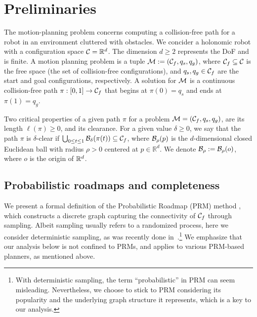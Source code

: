 \section{Preliminaries}\label{sec:preliminaries}
The motion-planning problem concerns computing a collision-free path for a robot in an environment cluttered with obstacles. We concider a holonomic robot with a configuration space $\mathcal{C} = \mathbb{R}^d$. %
The dimension $d\geq 2$ represents the DoF and is finite. A motion planning problem is a tuple $\mathcal{M}:= (\mathcal{C}_f, q_{s},  q_{g})$, where $\mathcal{C}_f\subseteq \mathcal{C}$ is the free space (the set of collision-free configurations), and $q_s,q_g\in \mathcal{C}_f$ are the start and goal configurations, respectively. A solution for $\mathcal{M}$ is a continuous collision-free path $\pi:[0,1]\to\mathcal{C}_f$ that begins at $\pi(0) = q_{s}$ and ends at $\pi(1) = q_g$.

Two critical properties of a given path $\pi$ for a problem $\mathcal{M}= (\mathcal{C}_f, q_{s},  q_{g})$, are its length $\ell(\pi)\geq 0$, and its clearance. For a given value $\delta\geq 0$, we say that the path $\pi$ is $\delta$-clear if $\bigcup_{0 \leq t \leq 1}\mathcal{B}_{\delta}(\pi(t)) \subseteq \mathcal{C}_f$, where $\mathcal{B}_\rho(p)$ is the $d$-dimensional closed Euclidean ball with radius $\rho>0$ centered at $p\in\mathbb{R}^d$. We denote $\mathcal{B}_\rho:=\mathcal{B}_\rho(o)$, where $o$ is the origin of $\mathbb{R}^d$.

\subsection{Probabilistic roadmaps and completeness}
We present a formal definition of the Probabilistic Roadmap (PRM) method \cite{kavraki1996probabilistic}, which constructs a discrete graph capturing the connectivity of $\mathcal{C}_f$ through sampling. Albeit sampling usually refers to a randomized process, here we consider deterministic sampling, as was recently done in~\cite{tsao2020sample,dayan2023near}.\footnote{With deterministic sampling, the term ``probabilistic'' in PRM can seem misleading. Nevertheless, we choose to stick to PRM considering its popularity and the underlying graph structure it represents, which is a key to our analysis.} We emphasize that our analysis below is not confined to PRMs, and applies to various PRM-based planners, as mentioned above. 

